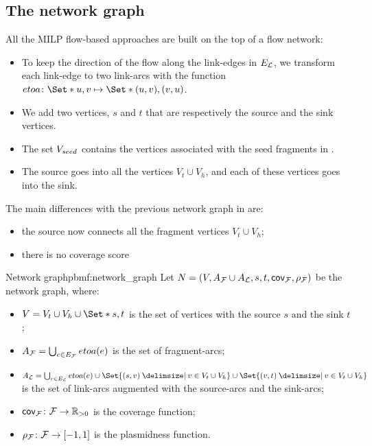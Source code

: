 \subsection{The network graph}\label{sec:pbmf:network}

All the MILP flow-based approaches are built on the top of a flow network:

\begin{itemize}
  \item To keep the direction of the flow along the link-edges in \(E_{\mathcal{L}}{}\), we transform each link-edge to two link-arcs with the function \(etoa \colon \Set*{u, v} \mapsto \Set*{(u, v), (v, u)}\).
  \item We add two vertices, \(s\) and \(t\) that are respectively the source and the sink vertices.
  \item The set \(V_{seed}{}\) contains the vertices associated with the seed fragments in \ContigSeeds{}.
  \item The source goes into all the vertices \(V_t \cup V_h\), and each of these vertices goes into the sink.
\end{itemize}

The main differences with the previous network graph in  are:
\begin{itemize}
  \item the source now connects all the fragment vertices \(V_t \cup V_h\);
  \item there is no coverage score
\end{itemize}

\begin{definition}{Network graph}{pbmf:network_graph}
  Let \(N = (V, A_{\mathcal{F}}{} \cup A_{\mathcal{L}}{}, s, t, \mathsf{cov}_{\mathcal{F}{}}, \rho_{\mathcal{F}{}})\) be the network graph, where:

  \begin{itemize}
    \item \( V = V_t \cup V_h \cup \Set*{s, t} \) is the set of vertices with the source \(s\) and the sink \(t\);
    \item \( A_{\mathcal{F}}{} = \bigcup_{e \in E_{\mathcal{F}}{}} etoa(e) \) is the set of fragment-arcs;
    \item \( A_\Links{} = \bigcup_{e \in E_\Links{}} etoa(e) \cup \Set{(s, v) \given v \in V_t \cup V_h} \cup \Set{(v, t) \given v \in V_t \cup V_h} \) is the set of link-arcs augmented with the source-arcs and the sink-arcs;
    \item \( \mathsf{cov}_{\mathcal{F}{}} \colon \mathcal{F}{} \to \mathbb{R}{}_{> 0} \) is the coverage function;
    \item \( \rho_{\mathcal{F}{}} \colon \mathcal{F}{} \to [-1, 1] \) is the plasmidness function.
  \end{itemize}
\end{definition}
